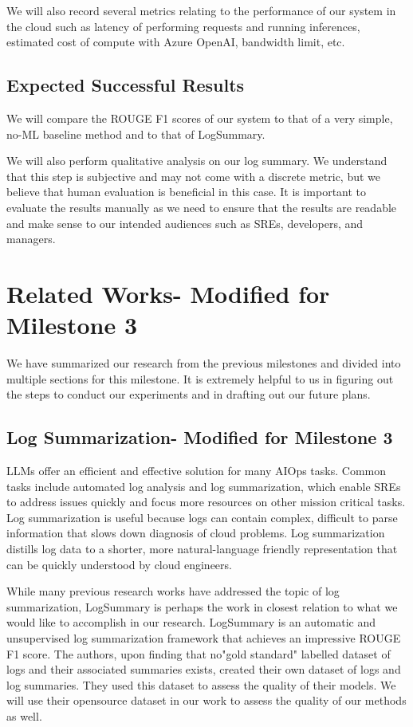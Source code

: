 \documentclass[conference]{IEEEtran}
\begin{document}
We will also record several metrics relating to the performance of our system in the cloud such as latency of performing requests and running inferences, estimated cost of compute with Azure OpenAI, bandwidth limit, etc.

\subsection{Expected Successful Results}
We will compare the ROUGE F1 scores of our system to that of a very simple, no-ML baseline method \cite{medium-text-summarization} and to that of LogSummary. \cite{10017337} 

We will also perform qualitative analysis on our log summary. We understand that this step is subjective and may not come with a discrete metric, but we believe that human evaluation is beneficial in this case. It is important to evaluate the results manually as we need to ensure that the results are readable and make sense to our intended audiences such as SREs, developers, and managers.

\section{Related Works- Modified for Milestone 3}
We have summarized our research from the previous milestones and divided into multiple sections for this milestone. It is extremely helpful to us in figuring out the steps to conduct our experiments and in drafting out our future plans.
\subsection{Log Summarization- Modified for Milestone 3}

LLMs offer an efficient and effective solution for many AIOps tasks. Common tasks include automated log analysis and log summarization, which enable SREs to address issues quickly and focus more resources on other mission critical tasks.\cite{gupta2023learning} Log summarization is useful because logs can contain complex, difficult to parse information that slows down diagnosis of cloud problems. Log summarization distills log data to a shorter, more natural-language friendly representation that can be quickly understood by cloud engineers.

While many previous research works have addressed the topic of log summarization, LogSummary \cite{10017337} is perhaps the work in closest relation to what we would like to accomplish in our research. LogSummary is an automatic and unsupervised log summarization framework that achieves an impressive ROUGE F1 score. The authors, upon finding that no"gold standard" labelled dataset of logs and their associated summaries exists, created their own dataset of logs and log summaries. They used this dataset to assess the quality of their models. We will use their opensource dataset in our work to assess the quality of our methods as well.
\end{document}
